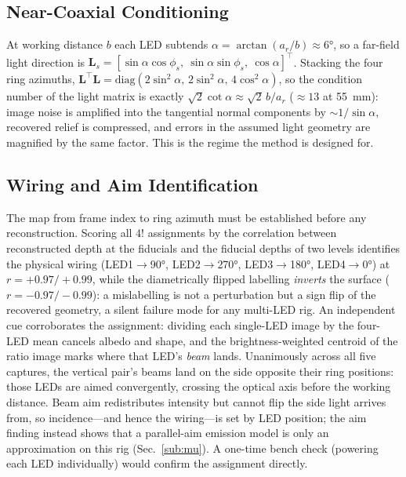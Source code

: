 \documentclass[conference]{IEEEtran}
\newcommand{\vL}{\bm{L}}
\begin{document}
\subsection{Near-Coaxial Conditioning}\label{sub:cond}
At working distance $b$ each LED subtends
$\alpha=\arctan(a_r/b)\approx\ang{6}$, so a far-field light direction is
$\vL_s=[\sin\alpha\cos\phi_s,\ \sin\alpha\sin\phi_s,\ \cos\alpha]^\top$.
Stacking the four ring azimuths, $\bm L^\top\bm L=
\mathrm{diag}(2\sin^2\alpha,\,2\sin^2\alpha,\,4\cos^2\alpha)$, so the
condition number of the light matrix is exactly $\sqrt{2}\cot\alpha\approx
\sqrt{2}\,b/a_r$ ($\approx\!13$ at \SI{55}{\milli\meter}): image noise is
amplified into the tangential normal components by $\sim\!1/\sin\alpha$,
recovered relief is compressed, and errors in the assumed light geometry
are magnified by the same factor.  This is the regime the method is
designed for.

\subsection{Wiring and Aim Identification}\label{sub:wiring}
The map from frame index to ring azimuth must be established before any
reconstruction.  Scoring all $4!$ assignments by the correlation between
reconstructed depth at the fiducials and the fiducial depths of two
levels identifies the physical wiring (LED1$\to$\ang{90},
LED2$\to$\ang{270}, LED3$\to$\ang{180}, LED4$\to$\ang{0}) at
$r=+0.97/+0.99$, while the diametrically flipped labelling \emph{inverts}
the surface ($r=-0.97/-0.99$): a mislabelling is not a perturbation but a
sign flip of the recovered geometry, a silent failure mode for any
multi-LED rig.  An independent cue corroborates the assignment: dividing
each single-LED image by the four-LED mean cancels albedo and shape, and
the brightness-weighted centroid of the ratio image marks where that
LED's \emph{beam} lands.  Unanimously across all five captures, the
vertical pair's beams land on the side opposite their ring positions:
those LEDs are aimed convergently, crossing the optical axis before the
working distance.  Beam aim redistributes intensity but cannot flip the
side light arrives from, so incidence---and hence the wiring---is set by
LED position; the aim finding instead shows that a parallel-aim emission
model is only an approximation on this rig (Sec.~\ref{sub:mu}).  A
one-time bench check (powering each LED individually)
would confirm the assignment directly.

\end{document}
